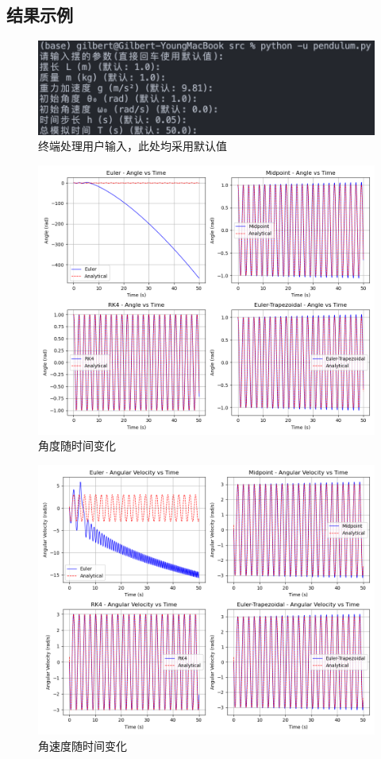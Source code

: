 \subsection{结果示例}
\begin{figure}[H]
    \centering
    \includegraphics[width=1.0\textwidth]{Problem_1/figs/terminal.png}
    \caption{终端处理用户输入，此处均采用默认值}
\end{figure}
\begin{figure}[H]
    \centering
    \includegraphics[width=1.0\textwidth]{Problem_1/figs/angle_time.png}
    \caption{角度随时间变化}
\end{figure}
\begin{figure}[H]
    \centering
    \includegraphics[width=1.0\textwidth]{Problem_1/figs/angle_velocity_time.png}
    \caption{角速度随时间变化}
\end{figure}
